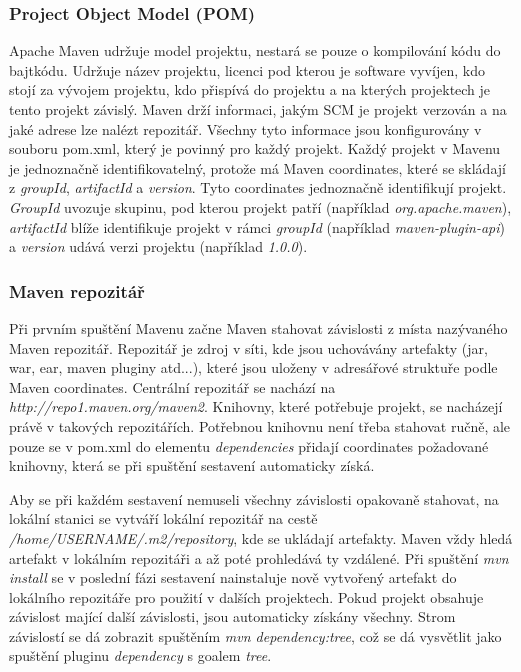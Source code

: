 \documentclass[11pt,twoside,a4paper]{book}
\begin{document}
\subsubsection{Project Object Model (POM)}

Apache Maven udržuje model projektu, nestará se pouze o kompilování kódu do bajtkódu.
Udržuje název projektu, licenci pod kterou je software vyvíjen, kdo stojí za vývojem projektu,
kdo přispívá do projektu a na kterých projektech je tento projekt závislý. Maven drží
informaci, jakým SCM je projekt verzován a na jaké adrese lze nalézt repozitář. Všechny tyto
informace jsou konfigurovány v souboru pom.xml, který je povinný pro každý projekt. Každý
projekt v Mavenu je jednoznačně identifikovatelný, protože má Maven coordinates, které se
skládají z {\em groupId}, {\em artifactId} a {\em version}. Tyto coordinates
jednoznačně identifikují projekt.
{\em GroupId} uvozuje skupinu, pod kterou projekt patří (například
{\em org.apache.maven}), {\em artifactId} blíže identifikuje projekt v rámci
{\em groupId} (například {\em maven-plugin-api}) a {\em version} udává verzi projektu
(například {\em 1.0.0}).

\subsubsection{Maven repozitář}

Při prvním spuštění Mavenu začne Maven stahovat závislosti z místa nazývaného Maven
repozitář. Repozitář je zdroj v síti, kde jsou uchovávány artefakty (jar, war,
ear, maven pluginy atd...), které jsou uloženy v adresářové struktuře podle Maven coordinates. Centrální
repozitář se nachází na {\em http://repo1.maven.org/maven2}. Knihovny, které
potřebuje projekt, se nacházejí právě v takových repozitářích. Potřebnou knihovnu není třeba
stahovat ručně, ale pouze se v pom.xml do elementu {\em dependencies} přidají
coordinates požadované knihovny, která se při spuštění sestavení automaticky získá.

Aby se při každém sestavení nemuseli všechny závislosti opakovaně stahovat, na
lokální stanici se vytváří lokální repozitář na cestě {\em
/home/USERNAME/.m2/repository}, kde se ukládají artefakty. Maven vždy hledá
artefakt v lokálním repozitáři a až poté prohledává ty vzdálené. Při spuštění
{\em mvn install} se v poslední fázi sestavení nainstaluje nově vytvořený
artefakt do lokálního repozitáře pro použití v dalších projektech. Pokud projekt obsahuje
závislost mající další závislosti, jsou automaticky získány všechny. Strom
závislostí se dá zobrazit spuštěním {\em mvn dependency:tree}, což se dá
vysvětlit jako spuštění pluginu {\em dependency} s goalem {\em tree}.
\end{document}

